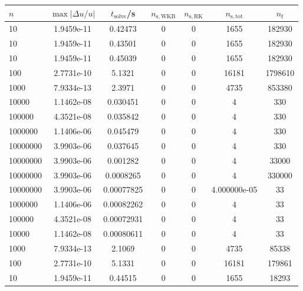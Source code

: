 \begin{tabular}{l c c c c c c}
\hline \hline 
$n$  &  $\max|\Delta u/u|$  &  $t_{\mathrm{solve}}$/\si{\s}  &  $n_{\mathrm{s,WKB}}$  &  $n_{\mathrm{s,RK}}$  &  $n_{\mathrm{s,tot}}$  &  $n_{\mathrm{f}}$ \\ \hline
10  &  1.9459e-11  &  0.42473  &  0  &  0  &  1655  &  182930  \\ 
 10  &  1.9459e-11  &  0.43501  &  0  &  0  &  1655  &  182930  \\ 
 10  &  1.9459e-11  &  0.45039  &  0  &  0  &  1655  &  182930  \\ 
 100  &  2.7731e-10  &  5.1321  &  0  &  0  &  16181  &  1798610  \\ 
 1000  &  7.9334e-13  &  2.3971  &  0  &  0  &  4735  &  853380  \\ 
 10000  &  1.1462e-08  &  0.030451  &  0  &  0  &  4  &  330  \\ 
 100000  &  4.3521e-08  &  0.035842  &  0  &  0  &  4  &  330  \\ 
 1000000  &  1.1406e-06  &  0.045479  &  0  &  0  &  4  &  330  \\ 
 10000000  &  3.9903e-06  &  0.037645  &  0  &  0  &  4  &  330  \\ 
 10000000  &  3.9903e-06  &  0.001282  &  0  &  0  &  4  &  33000  \\ 
 10000000  &  3.9903e-06  &  0.0008265  &  0  &  0  &  4  &  330000  \\ 
 10000000  &  3.9903e-06  &  0.00077825  &  0  &  0  &  4.000000e-05  &  33  \\ 
 1000000  &  1.1406e-06  &  0.00082262  &  0  &  0  &  4  &  33  \\ 
 100000  &  4.3521e-08  &  0.00072931  &  0  &  0  &  4  &  33  \\ 
 10000  &  1.1462e-08  &  0.00080611  &  0  &  0  &  4  &  33  \\ 
 1000  &  7.9334e-13  &  2.1069  &  0  &  0  &  4735  &  85338  \\ 
 100  &  2.7731e-10  &  5.1331  &  0  &  0  &  16181  &  179861  \\ 
 10  &  1.9459e-11  &  0.44515  &  0  &  0  &  1655  &  18293  \\ 
\end{tabular}
